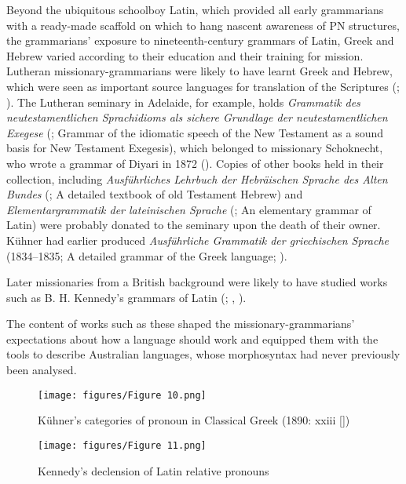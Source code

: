 Beyond the ubiquitous schoolboy Latin, which provided all early grammarians with a ready-made scaffold on which to hang nascent awareness of PN structures, the grammarians' exposure to nineteenth-century grammars of Latin, Greek and Hebrew varied according to their education and their training for mission. Lutheran missionary-grammarians were likely to have learnt Greek and Hebrew, which were seen as important source languages for translation of the Scriptures (\citealt[67--78]{rathjen_difficult_1998}; \citealt[332]{strehlow_tale_2011}). The Lutheran seminary in Adelaide, for example, holds \textit{Grammatik des neutestamentlichen Sprachidioms als sichere Grundlage der neutestamentlichen Exegese} (\citealt{winer_grammatik_1844}; Grammar of the idiomatic speech of the New Testament as a sound basis for New Testament Exegesis), which belonged to missionary Schoknecht, who wrote a grammar of Diyari in 1872 (). Copies of other books held in their collection, including \textit{Ausführliches Lehrbuch der Hebräischen Sprache des Alten Bundes} (\citealt{ewald_ausfuhrliches_1844}; A detailed textbook of old Testament Hebrew) and \textit{Elementargrammatik der lateinischen Sprache} (\citealt{kuhner_elementargrammatik_1841}; An elementary grammar of Latin) were probably donated to the seminary upon the death of their owner. Kühner had earlier produced \textit{Ausführliche Grammatik der griechischen Sprache} (1834--1835; A detailed grammar of the Greek language; ).

\hspace*{-.9pt}Later missionaries from a British background were likely to have studied works such as B. H. Kennedy’s grammars of Latin (\citealt{kennedy_public_1879}; , ).

The content of works such as these shaped the missionary-grammarians' expectations about how a language should work and equipped them with the tools to describe Australian languages, whose morphosyntax had never previously been analysed.
 
\begin{figure}
\texttt{[image: figures/Figure 10.png]}
\caption{Kühner’s categories of pronoun in Classical Greek (1890: xxiii [\citeyear{raphael_ausfuhrliche_1834}])}
\label{fig:key:2-10}
\end{figure} 

\begin{figure}
\texttt{[image: figures/Figure 11.png]}
\caption{Kennedy's declension of Latin relative pronouns \citep[140]{kennedy_public_1879}}
\label{fig:key:2-11}
\end{figure}

